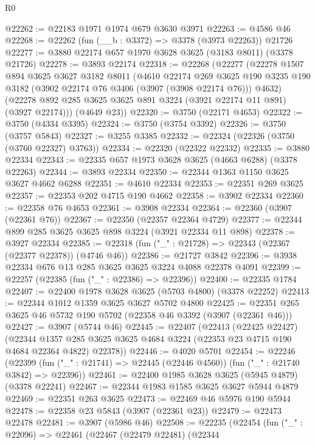 \begin{lexlean}{R0}
\begin{coremodule}
@22262 := @22183 @1971 @1974 @679 @3630 @3971
@22263 := @4586 @46
@22268 := @22262 (fun (__b : @3372) => @3378 (@3973 @22263)) @21726
@22277 := @3880 @22174 @657 @1970 @3628 @3625 (@3183 @8011) (@3378 @21726)
@22278 := @3893 @22174
@22318 := @22268
    (@22277
      (@22278
        @1507
        @894
        @3625
        @3627
        @3182
        @8011
        (@4610
          @22174
          @269
          @3625
          @190
          @3235
          @190
          @3182
          (@3902 @22174 @76 @3406 (@3907 (@3908 @22174 @76)))
          @4632)
        (@22278 @892 @285 @3625 @3625 @891 @3224 (@3921 @22174 @11 @891) (@3927 @22174)))
      (@4649 @23))
@22320 := @3750 (@22171 @4653)
@22322 := @3750 (@4334 @3395)
@22324 := @3750 (@3754 @3392)
@22326 := @3750 (@3757 @5843)
@22327 := @3255 @3385
@22332 := @22324 (@22326 (@3750 (@3760 @22327) @3763))
@22334 := @22320 (@22322 @22332)
@22335 := @3880 @22334
@22343 := @22335 @657 @1973 @3628 @3625 (@4663 @6288) (@3378 @22263)
@22344 := @3893 @22334
@22350 := @22344 @1363 @1150 @3625 @3627 @4662 @6288
@22351 := @4610 @22334
@22353 := @22351 @269 @3625
@22357 := @22353 @202 @4715 @190 @4662
@22358 := @3902 @22334
@22360 := @22358 @76 @4653
@22361 := @3908 @22334
@22364 := @22360 (@3907 (@22361 @76))
@22367 := @22350 (@22357 @22364 @4729)
@22377 := @22344 @899 @285 @3625 @3625 @898 @3224 (@3921 @22334 @11 @898)
@22378 := @3927 @22334
@22385 := @22318 (fun ("_" : @21728) => @22343 (@22367 (@22377 @22378)) (@4746 @46))
@22386 := @21727 @3842
@22396 := @3938 @22334 @676 @13 @285 @3625 @3625 @3224 @4088 @22378 @4091
@22399 := @22257 (@22385 (fun ("_" : @22386) => @22396))
@22400 := @22335 @1784
@22407 := @22400 @1978 @3628 @3625 (@5703 @4800) (@3378 @22252)
@22413 := @22344 @1012 @1359 @3625 @3627 @5702 @4800
@22425 := @22351 @265 @3625 @46 @5732 @190 @5702 (@22358 @46 @3392 (@3907 (@22361 @46)))
@22427 := @3907 (@5744 @46)
@22445 := @22407
    (@22413
      (@22425 @22427)
      (@22344 @1357 @285 @3625 @3625 @4684 @3224 (@22353 @23 @4715 @190 @4684 @22364 @4822) @22378))
@22446 := @4020 @5701
@22454 := @22246
    (@22399 (fun ("_" : @21741) => @22445 (@22446 @4560)) (fun ("_" : @21740 @3842) => @22396))
@22461 := @22400 @1985 @3628 @3625 (@5945 @4879) (@3378 @22241)
@22467 := @22344 @1983 @1585 @3625 @3627 @5944 @4879
@22469 := @22351 @263 @3625
@22473 := @22469 @46 @5976 @190 @5944
@22478 := @22358 @23 @5843 (@3907 (@22361 @23))
@22479 := @22473 @22478
@22481 := @3907 (@5986 @46)
@22508 := @22235
    (@22454
      (fun ("_" : @22096) =>
      @22461
        (@22467
          (@22479 @22481)
          (@22344

\end{coremodule}
\end{lexlean}
